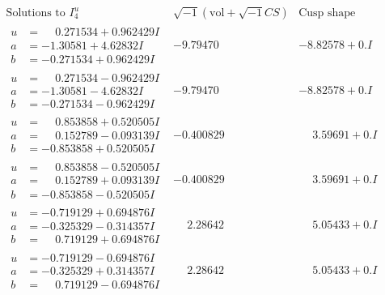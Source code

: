 \documentclass[1p]{elsarticle_modified}
\theoremstyle{definition}
\newcommand{\I}{\sqrt{-1}}
\begin{document}
$$\begin{array}{c|c|c}  
\text{Solutions to }I^u_{4}& \I (\text{vol} + \sqrt{-1}CS) & \text{Cusp shape}\\
 \hline 
\begin{aligned}
u &= \phantom{-}0.271534 + 0.962429 I \\
a &= -1.30581 + 4.62832 I \\
b &= -0.271534 + 0.962429 I\end{aligned}
 & -9.79470\phantom{ +0.000000I} & -8.82578 + 0. I\phantom{ +0.000000I} \\ \hline\begin{aligned}
u &= \phantom{-}0.271534 - 0.962429 I \\
a &= -1.30581 - 4.62832 I \\
b &= -0.271534 - 0.962429 I\end{aligned}
 & -9.79470\phantom{ +0.000000I} & -8.82578 + 0. I\phantom{ +0.000000I} \\ \hline\begin{aligned}
u &= \phantom{-}0.853858 + 0.520505 I \\
a &= \phantom{-}0.152789 - 0.093139 I \\
b &= -0.853858 + 0.520505 I\end{aligned}
 & -0.400829\phantom{ +0.000000I} & \phantom{-}3.59691 + 0. I\phantom{ +0.000000I} \\ \hline\begin{aligned}
u &= \phantom{-}0.853858 - 0.520505 I \\
a &= \phantom{-}0.152789 + 0.093139 I \\
b &= -0.853858 - 0.520505 I\end{aligned}
 & -0.400829\phantom{ +0.000000I} & \phantom{-}3.59691 + 0. I\phantom{ +0.000000I} \\ \hline\begin{aligned}
u &= -0.719129 + 0.694876 I \\
a &= -0.325329 - 0.314357 I \\
b &= \phantom{-}0.719129 + 0.694876 I\end{aligned}
 & \phantom{-}2.28642\phantom{ +0.000000I} & \phantom{-}5.05433 + 0. I\phantom{ +0.000000I} \\ \hline\begin{aligned}
u &= -0.719129 - 0.694876 I \\
a &= -0.325329 + 0.314357 I \\
b &= \phantom{-}0.719129 - 0.694876 I\end{aligned}
 & \phantom{-}2.28642\phantom{ +0.000000I} & \phantom{-}5.05433 + 0. I\phantom{ +0.000000I} \\ \hline\begin{aligned}

\end{aligned}
\end{array}$$
\end{document}
